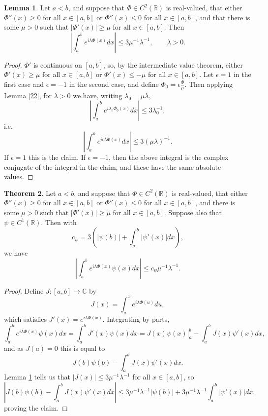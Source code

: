\documentclass{article}
\theoremstyle{definition}
\newtheorem{theorem}{Theorem}
\newtheorem{lemma}[theorem]{Lemma}
\theoremstyle{definition}
\begin{document}
\begin{lemma}
Let $a<b$,
 and suppose that $\Phi \in C^2(\mathbb{R})$ is real-valued,  that either $\Phi''(x) \geq 0$ for all $x \in [a,b]$ or $\Phi''(x) \leq 0$ for all $x \in [a,b]$,
 and that  there is some $\mu > 0$ such that $|\Phi'(x)| \geq \mu$ for  all $x \in [a,b]$. 
 Then 
 \[
\left| \int_a^b e^{i\lambda \Phi(x)} dx\right|  \leq 3 \mu^{-1} \lambda^{-1}, \qquad \lambda >0.
 \]
 \label{muinequality}
\end{lemma}
\begin{proof}
$\Phi'$ is continuous on  $[a,b]$, so, by the intermediate value theorem, either
$\Phi'(x) \geq \mu$ for all $x \in [a,b]$ or $\Phi'(x) \leq -\mu$ for all $x \in [a,b]$. Let $\epsilon=1$ in the first
case and $\epsilon=-1$ in the second case, and define $\Phi_0=\epsilon \frac{\Phi}{\mu}$.
Then applying Lemma \ref{22}, for $\lambda>0$ we have, writing $\lambda_0=\mu \lambda$,
\[
\left| \int_a^b e^{i \lambda_0 \Phi_0(x)} dx \right| \leq 3\lambda_0^{-1},
\]
i.e.
\[
\left| \int_a^b e^{i \epsilon \lambda \Phi(x)} dx \right| \leq 3(\mu \lambda)^{-1}.
\]
If $\epsilon=1$ this is the claim. If $\epsilon=-1$, then the above integral is the complex conjugate of the integral in the claim, and these have the same
absolute values.
\end{proof}


\begin{theorem}
Let $a<b$,
 and suppose that $\Phi \in C^2(\mathbb{R})$ is real-valued, that either $\Phi''(x) \geq 0$ for all $x \in [a,b]$ or $\Phi''(x) \leq 0$ for all $x \in [a,b]$,
 and  there is some $\mu > 0$ such that $|\Phi'(x)| \geq \mu$ for  all $x \in [a,b]$.  Suppose also
 that $\psi \in C^1(\mathbb{R})$.
 Then with
 \[
 c_\psi = 3\left( |\psi(b)| + \int_a^b |\psi'(x)| dx \right),
 \]
 we have
 \[
 \left| \int_a^b e^{i\lambda \Phi(x)} \psi(x) dx \right| \leq c_\psi \mu^{-1} \lambda^{-1}.
 \]
 \label{lambdaamplitude}
\end{theorem}
\begin{proof}
Define $J:[a,b] \to \mathbb{C}$ by
\[
J(x) = \int_a^x e^{i\lambda \Phi(u)} du,
\]
which satisfies $J'(x)=e^{i\lambda \Phi(x)}$. Integrating by parts, 
\[
\int_a^b e^{i\lambda \Phi(x)} \psi(x) dx = \int_a^b J'(x) \psi(x) dx =
J(x)\psi(x) \bigg|_a^b -\int_a^b J(x) \psi'(x) dx,
\]
and as $J(a)=0$ this is equal to
\[
J(b)\psi(b)-\int_a^b J(x) \psi'(x) dx.
\]
Lemma \ref{muinequality} tells us that $|J(x)| \leq 3\mu^{-1} \lambda^{-1}$ for all $x \in [a,b]$, so
\[
\left|J(b)\psi(b)-\int_a^b J(x) \psi'(x) dx\right| \leq 3\mu^{-1} \lambda^{-1} |\psi(b)|
+ 3\mu^{-1} \lambda^{-1} \int_a^b |\psi'(x)| dx,
\]
proving the claim.
\end{proof}
\end{document}
